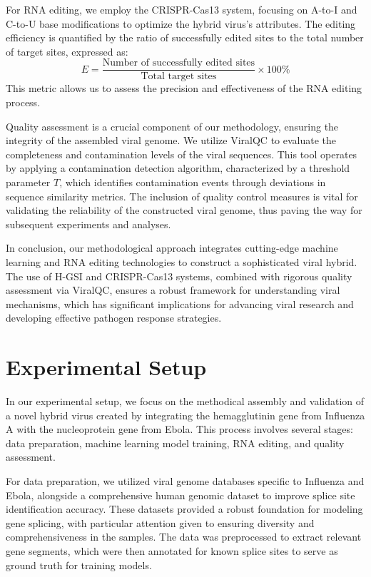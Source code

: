 \documentclass{article}
\begin{document}
For RNA editing, we employ the CRISPR-Cas13 system, focusing on A-to-I and C-to-U base modifications to optimize the hybrid virus's attributes. The editing efficiency is quantified by the ratio of successfully edited sites to the total number of target sites, expressed as:
\[ E = \frac{\text{Number of successfully edited sites}}{\text{Total target sites}} \times 100\% \]
This metric allows us to assess the precision and effectiveness of the RNA editing process.

Quality assessment is a crucial component of our methodology, ensuring the integrity of the assembled viral genome. We utilize ViralQC to evaluate the completeness and contamination levels of the viral sequences. This tool operates by applying a contamination detection algorithm, characterized by a threshold parameter \( T \), which identifies contamination events through deviations in sequence similarity metrics. The inclusion of quality control measures is vital for validating the reliability of the constructed viral genome, thus paving the way for subsequent experiments and analyses.

In conclusion, our methodological approach integrates cutting-edge machine learning and RNA editing technologies to construct a sophisticated viral hybrid. The use of H-GSI and CRISPR-Cas13 systems, combined with rigorous quality assessment via ViralQC, ensures a robust framework for understanding viral mechanisms, which has significant implications for advancing viral research and developing effective pathogen response strategies.

\section{Experimental Setup}
In our experimental setup, we focus on the methodical assembly and validation of a novel hybrid virus created by integrating the hemagglutinin gene from Influenza A with the nucleoprotein gene from Ebola. This process involves several stages: data preparation, machine learning model training, RNA editing, and quality assessment.

For data preparation, we utilized viral genome databases specific to Influenza and Ebola, alongside a comprehensive human genomic dataset to improve splice site identification accuracy. These datasets provided a robust foundation for modeling gene splicing, with particular attention given to ensuring diversity and comprehensiveness in the samples. The data was preprocessed to extract relevant gene segments, which were then annotated for known splice sites to serve as ground truth for training models.
\end{document}
